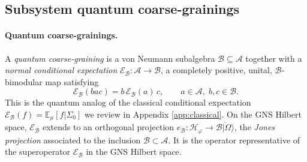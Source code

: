 \documentclass[a4paper,11pt]{article}
\theoremstyle{definition}
\newcommand{\mB}{\mathcal{B}}
\newcommand{\mE}{\mathcal{E}}
\begin{document}

\subsection{Subsystem quantum coarse-grainings}
\label{subsec:quantum-coarse}


\paragraph{Quantum coarse-grainings.}
A \emph{quantum coarse-graining} is a von Neumann subalgebra $\mathcal{B}\subseteq\mathcal{A}$
together with a \emph{normal conditional expectation}
$\mE_{\mathcal{B}}:\mathcal{A}\to\mathcal{B}$, a completely positive, unital,
$\mathcal{B}$-bimodular map satisfying
\begin{equation}
  \mE_{\mathcal{B}}(bac) = b\,\mE_{\mathcal{B}}(a)\,c, \qquad a\in\mathcal{A},\;b,c\in\mathcal{B}.
  \label{eq:CE-bimodular}
\end{equation}
This is the quantum analog of the classical conditional expectation
$\mE_{\mathcal{B}}(f) = \mathbb{E}_\mu[f|\Sigma_0]$ we review  in Appendix \ref{app:classical}.
On the GNS Hilbert space, $\mE_{\mathcal{B}}$ extends to an orthogonal projection
$e_{\mathcal{B}}:\mathcal{H}_\varphi\to\overline{\mathcal{B}|\Omega\rangle}$, the {\it Jones
projection} associated to the inclusion $\mathcal{B}\subset\mathcal{A}$. It is the operator representative of the superoperator $\mE_\mB$ in the GNS Hilbert space. 
\end{document}
